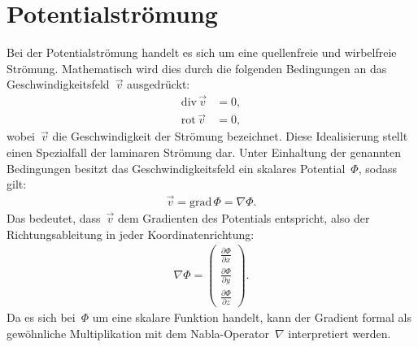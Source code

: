 %
%
%
%
\section{Potentialströmung\label{ueberschall:section:potentialstroemung}}
Bei der Potentialströmung handelt es sich um eine 
quellenfreie und wirbelfreie Strömung.
Mathematisch wird dies durch die folgenden Bedingungen 
an das Geschwindigkeitsfeld~$\vec{v}$ ausgedrückt:
\begin{align*}
    \mathrm{div}\,\vec{v} &= 0, \\
    \mathrm{rot}\,\vec{v} &= 0,
\end{align*}
wobei~$\vec{v}$ die Geschwindigkeit der Strömung bezeichnet.
Diese Idealisierung stellt einen Spezialfall der
laminaren Strömung dar. 
Unter Einhaltung der genannten Bedingungen 
besitzt das Geschwindigkeitsfeld ein skalares
Potential~$\Phi$, sodass gilt:
\begin{align}
    \vec{v} 
    = 
    \mathrm{grad}\,\Phi 
    = 
    \nabla \Phi.\label{eq:potential}
\end{align}
Das bedeutet, dass~$\vec{v}$ dem Gradienten des Potentials 
entspricht, also der Richtungsableitung in jeder 
Koordinatenrichtung:
\begin{align*}
    \nabla \Phi =
    \begin{pmatrix}
        \frac{\partial \Phi}{\partial x} \\
        \frac{\partial \Phi}{\partial y} \\
        \frac{\partial \Phi}{\partial z}
    \end{pmatrix}.
\end{align*}
Da es sich bei~$\Phi$ um eine skalare Funktion handelt, 
kann der Gradient formal als gewöhnliche Multiplikation 
mit dem Nabla-Operator~$\nabla$ interpretiert werden.


